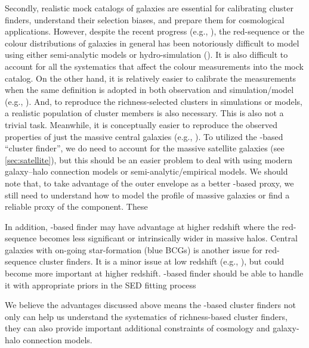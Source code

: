 \documentclass[fleqn,usenatbib,useAMS,english]{mnras}
\begin{document}
    Secondly, realistic mock catalogs of galaxies are essential for calibrating cluster 
    finders, understand their selection biases, and prepare them for cosmological applications.
    However, despite the recent progress (e.g., \citealt{DeRose2019, Hearin2020}), the
    red-sequence or the colour distributions of galaxies in general has been notoriously
    difficult to model using either semi-analytic models or hydro-simulation (\addref{}).
    It is also difficult to account for all the systematics that affect the colour measurements
    into the mock catalog.
    On the other hand, it is relatively easier to calibrate the \mstar{} measurements when the
    same definition is adopted in both observation and simulation/model (e.g.,
    \citet{Ardila2021}).
    And, to reproduce the richness-selected clusters in simulations or models, a realistic 
    population of cluster members is also necessary. This is also not a trivial task.
    Meanwhile, it is conceptually easier to reproduce the observed properties of just the 
    massive central galaxies (e.g., \citealt{Moster2020}).
    To utilized the \mstar{}-based ``cluster finder'', we do need to account for the massive
    satellite galaxies (see \ref{sec:satellite}), but this should be an easier problem to deal
    with using modern galaxy--halo connection models or semi-analytic/empirical models.
    We should note that, to take advantage of the outer envelope \mstar{} as a better
    \mstar{}-based \mvir{} proxy, we still need to understand how to model the \mstar{} 
    profile of massive galaxies or find a reliable proxy of the \exsitu{} component.
    These 

    In addition, \mstar{}-based finder may have advantage at higher redshift where the 
    red-sequence becomes less significant or intrinsically wider in massive halos.
    Central galaxies with on-going star-formation (blue BCGs) is another issue for 
    red-sequence cluster finders. 
    It is a minor issue at low redshift (e.g., \citealt{Rykoff2014}), but could become
    more important at higher redshift.
    \mstar{}-based finder should be able to handle it with appropriate priors in the
    SED fitting process

    We believe the advantages discussed above means the \mstar{}-based cluster finders
    not only can help us understand the systematics of richness-based cluster finders,
    they can also provide important additional constraints of cosmology and 
    galaxy-halo connection models.
\end{document}
